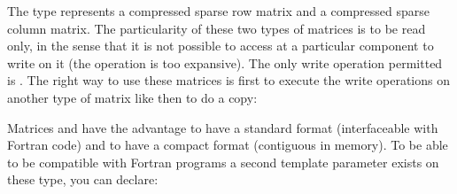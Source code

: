 \documentclass[a4paper,11pt,english]{sphinxmanual}
\begin{document}
The type  represents a compressed sparse row matrix and  a compressed sparse column matrix. The particularity of these two types of matrices is to be read only, in the sense that it is not possible to access at a particular component to write on it (the operation is too expansive). The only write operation permitted is . The right way to use these matrices is first to execute the write operations on another type of matrix like  then to do a copy:

\begin{sphinxVerbatim}[commandchars=\\\{\}]
   
   
  
 
 
 
\end{sphinxVerbatim}

Matrices  and  have the advantage to have a standard format (interfaceable with Fortran code) and to have a compact format (contiguous in memory). To be able to be compatible with Fortran programs a second template parameter exists on these type, you can declare:

\begin{sphinxVerbatim}[commandchars=\\\{\}]
  
  
\end{sphinxVerbatim}
\end{document}
